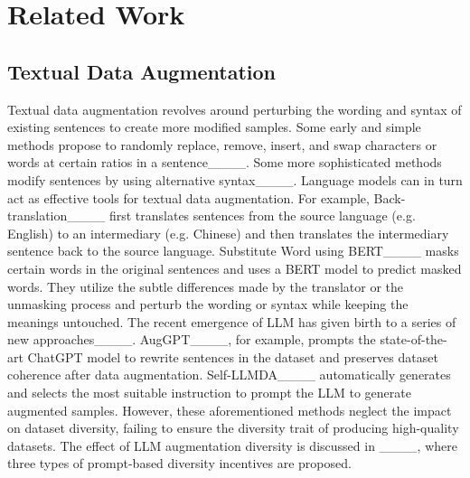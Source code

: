 \section{Related Work}
\vspace{-2mm}
\subsection{Textual Data Augmentation}
\vspace{-1mm}
Textual data augmentation revolves around perturbing the wording and syntax of existing sentences to create more modified samples. 
Some early and simple methods propose to randomly replace, remove, insert, and swap characters or words at certain ratios in a sentence____. 
Some more sophisticated methods modify sentences by using alternative syntax____. 
Language models can in turn act as effective tools for textual data augmentation. 
For example, Back-translation____ first translates sentences from the source language (e.g. English) to an intermediary (e.g. Chinese) and then translates the intermediary sentence back to the source language. 
Substitute Word using BERT____ masks certain words in the original sentences and uses a BERT model to predict masked words. 
They utilize the subtle differences made by the translator or the unmasking process and perturb the wording or syntax while keeping the meanings untouched. 
The recent emergence of LLM has given birth to a series of new approaches____. 
AugGPT____, for example, prompts the state-of-the-art ChatGPT model to rewrite sentences in the dataset and preserves dataset coherence after data augmentation. 
Self-LLMDA____ automatically generates and selects the most suitable instruction to prompt the LLM to generate augmented samples. 
However, these aforementioned methods neglect the impact on dataset diversity, failing to ensure the diversity trait of producing high-quality datasets. 
The effect of LLM augmentation diversity is discussed in ____, where three types of prompt-based diversity incentives are proposed. 


\vspace{-0.2cm}
